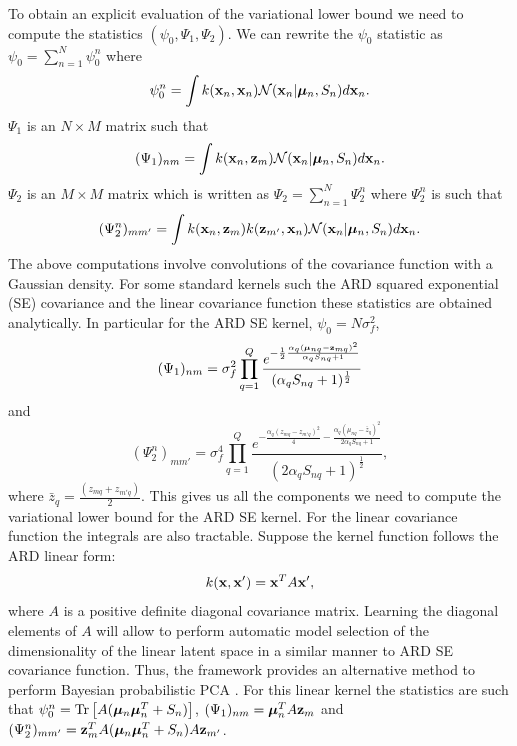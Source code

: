 \documentclass[twoside,times]{article}
\begin{document}
To obtain an explicit evaluation of the variational lower bound we
need to compute the statistics $(\psi_0,\Psi_1,\Psi_2)$. We can
rewrite the $\psi_0$ statistic as $\psi_0 = \sum_{n=1}^N \psi_0^n$
where
\begin{equation}
\psi_0^n = \int k(\mathbf{x}_n,\mathbf{x}_n) \mathcal{N}(\mathbf{x}_n |\bm{\mu}_n , S_n) d \mathbf{x}_n.
\label{eq:psi0}
\end{equation}
$\Psi_1$ is an $N \times M$ matrix such that  
\begin{equation}
  (\Psi_1)_{nm} = \int k(\mathbf{x}_n,\mathbf{z}_m) \mathcal{N}(\mathbf{x}_n|\bm{\mu}_n, S_n) d
  \mathbf{x}_n.
\label{eq:psi1}
\end{equation}
$\Psi_2$ is an $M \times M$ matrix which is written as
 $\Psi_2 = \sum_{n=1}^N \Psi_2^n$ where $\Psi_2^n$ is such that 
\begin{equation}
  (\Psi^n_2)_{m m'} = \int k(\mathbf{x}_n,\mathbf{z}_m)
  k(\mathbf{z}_{m'},\mathbf{x}_n) \mathcal{N}(\mathbf{x}_n|\bm{\mu}_n, S_n) d \mathbf{x}_n.
\label{eq:psi2}
\end{equation}
The above computations involve convolutions of the covariance function
with a Gaussian density. For some standard kernels such the ARD
squared exponential (SE) covariance and the linear covariance function
these statistics are obtained analytically. In particular for the ARD
SE kernel, $\psi_0 = N \sigma_f^2$,
$$
(\Psi_1)_{nm} = \sigma^2_f \prod_{q=1}^Q
\frac{ e^{ - \frac{1}{2} \frac{ \alpha_q (\bm{\mu}_{nq}  -
    \mathbf{z}_{mq})^2}{\alpha_q S_{nq} + 1}}}
{( \alpha_q S_{nq} + 1)^{\frac{1}{2}}} 
$$ 
and 
$$
(\Psi^n_2)_{m m'} = \sigma_f^4 
\prod_{q=1}^Q \frac{ e^{-  \frac{\alpha_q (z_{mq} -
    z_{m'q})^2}{4} - \frac{\alpha_q \left(\mu_{nq} -
 \bar{z}_{q} \right)^2}{2 \alpha_q S_{nq} + 1}}}
{(2 \alpha_q S_{nq} + 1)^{\frac{1}{2}}},
$$  
where $\bar{z}_{q} = \frac{(z_{mq} + z_{m'q})}{2}$. This gives us all
the components we need to compute the variational lower bound for the
ARD SE kernel. For the linear covariance function the integrals
are also tractable. Suppose the kernel function follows the ARD linear
form:
\begin{equation} 
k(\mathbf{x},\mathbf{x}') = \mathbf{x}^T A \mathbf{x}', 
\end{equation}
where $A$ is a positive definite diagonal covariance matrix.  Learning
the diagonal elements of $A$ will allow to perform automatic model selection of
the dimensionality of the linear latent space in a similar manner to
ARD SE covariance function. Thus, the framework provides an alternative
method to perform Bayesian probabilistic PCA
\citep{Bishop:bayesPCA98,Minka:automatic01}. For this linear kernel
the statistics are such that $ \psi_0^n =
\text{Tr}\left[A (\bm{\mu}_n \bm{\mu}_n^T + S_n) \right]$,
$(\Psi_1)_{nm} = \bm{\mu}_n^T A \mathbf{z}_m$ and $(\Psi_2^n)_{mm'} =
\mathbf{z}_m^T A (\bm{\mu}_n\bm{\mu}_n^T + S_n ) A \mathbf{z}_{m'}$.
\end{document}
